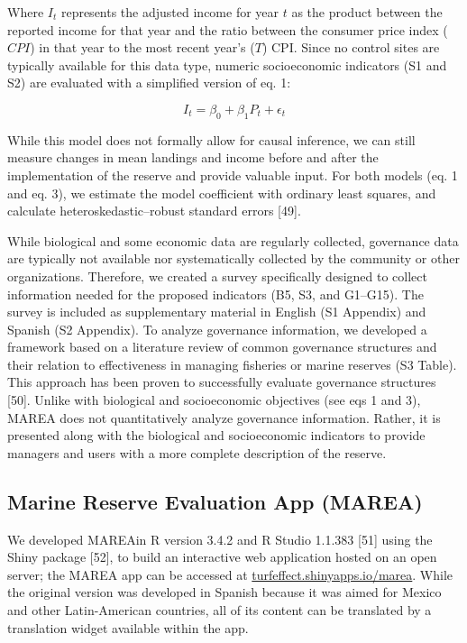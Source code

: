 \documentclass[12pt,]{article}
\begin{document}
Where \(I_t\) represents the adjusted income for year \(t\) as the
product between the reported income for that year and the ratio between
the consumer price index (\(CPI\)) in that year to the most recent
year's (\(T\)) CPI. Since no control sites are typically available for
this data type, numeric socioeconomic indicators (S1 and S2) are
evaluated with a simplified version of eq. 1:

\begin{equation}I_{t}=\beta_0 + \beta_1P_{t} + \epsilon_{t}\end{equation}

While this model does not formally allow for causal inference, we can
still measure changes in mean landings and income before and after the
implementation of the reserve and provide valuable input. For both
models (eq. 1 and eq. 3), we estimate the model coefficient with
ordinary least squares, and calculate heteroskedastic--robust standard
errors {[}49{]}.

While biological and some economic data are regularly collected,
governance data are typically not available nor systematically collected
by the community or other organizations. Therefore, we created a survey
specifically designed to collect information needed for the proposed
indicators (B5, S3, and G1--G15). The survey is included as
supplementary material in English (S1 Appendix) and Spanish (S2
Appendix). To analyze governance information, we developed a framework
based on a literature review of common governance structures and their
relation to effectiveness in managing fisheries or marine reserves (S3
Table). This approach has been proven to successfully evaluate
governance structures {[}50{]}. Unlike with biological and socioeconomic
objectives (see eqs 1 and 3), MAREA does not quantitatively analyze
governance information. Rather, it is presented along with the
biological and socioeconomic indicators to provide managers and users
with a more complete description of the reserve.

\subsection{Marine Reserve Evaluation App
(MAREA)}\label{marine-reserve-evaluation-app-marea}

We developed MAREAin R version 3.4.2 and R Studio 1.1.383 {[}51{]} using
the Shiny package {[}52{]}, to build an interactive web application
hosted on an open server; the MAREA app can be accessed at
\href{turfeffect.shinyapps.io/marea/}{turfeffect.shinyapps.io/marea}.
While the original version was developed in Spanish because it was aimed
for Mexico and other Latin-American countries, all of its content can be
translated by a translation widget available within the app.
\end{document}
